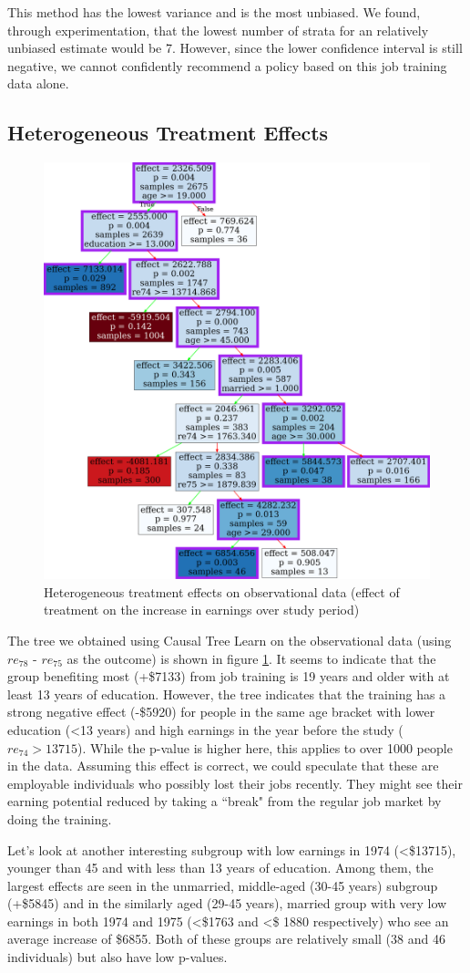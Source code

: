 \documentclass[12pt]{article}
\begin{document}
This method has the lowest variance and is the most unbiased. We found, through experimentation, that the lowest number of strata for an relatively unbiased estimate would be 7. However, since the lower confidence interval is still negative, we cannot confidently recommend a policy based on this job training data alone.

\subsection{Heterogeneous Treatment Effects}
\begin{figure}
    \centering
    \includegraphics[width=0.5\linewidth]{bin_tree.png}
    \caption{Heterogeneous treatment effects on observational data (effect of treatment on the increase in earnings over study period) }
    \label{fig:hte}
\end{figure}

The tree we obtained using Causal Tree Learn on the observational data (using $re_{78}$ - $re_{75}$ as the outcome) is shown in figure \ref{fig:hte}. It seems to indicate that the group benefiting most (+\$7133) from job training is 19 years and older with at least 13 years of education. However, the tree indicates that the training has a strong negative effect (-\$5920) for people in the same age bracket with lower education (\textless 13 years) and high earnings in the year before the study ($re_{74} > 13715$). While the p-value is higher here, this applies to over 1000 people in the data. Assuming this effect is correct, we could speculate that these are employable individuals who possibly lost their jobs recently. They might see their earning potential reduced by taking a ``break" from the regular job market by doing the training.

Let's look at another interesting subgroup with low earnings in 1974 (\textless \$13715), younger than 45 and with less than 13 years of education. Among them, the largest effects are seen in the unmarried, middle-aged (30-45 years) subgroup (+\$5845) and in the similarly aged (29-45 years), married group with very low earnings in both 1974 and 1975 (\textless \$1763 and \textless \$ 1880 respectively) who see an average increase of \$6855.
Both of these groups are relatively small (38 and 46 individuals) but also have low p-values.
\end{document}

